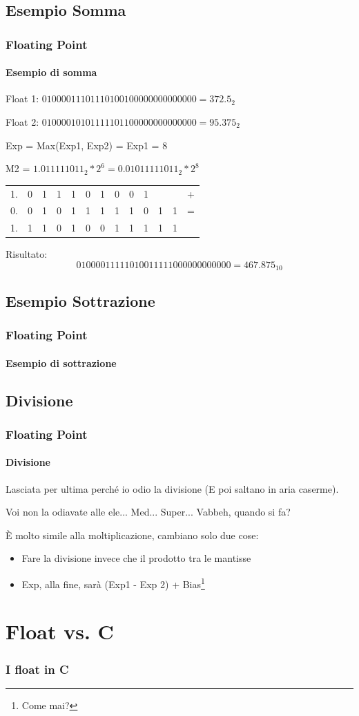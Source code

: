 \documentclass{beamer}
\begin{document}
	\subsection{Esempio Somma}
  \begin{frame}
    \frametitle{Floating Point}
    \framesubtitle{Esempio di somma}
    Float 1: $01000011101110100100000000000000 = 372.5_{2}$
    
    Float 2: $01000010101111101100000000000000 = 95.375_{2}$
    
    \pause
    \vspace{2em}
    
    Exp = Max(Exp1, Exp2) = Exp1 = 8
    
    M2 = $1.011111011_{2} * 2^{6} = 0.01011111011_{2} * 2^{8}$
    \vspace{1em}
    
    \setlength{\tabcolsep}{2pt}
    \begin{center}
    		\begin{tabular}{cccccccccccc|c}
    		1. & 0 & 1 & 1 & 1 & 0 & 1 & 0 & 0 & 1 &   &   & + \\ 
    		0. & 0 & 1 & 0 & 1 & 1 & 1 & 1 & 1 & 0 & 1 & 1 & = \\ 
    		\hline 
    		1. & 1 & 1 & 0 & 1 & 0 & 0 & 1 & 1 & 1 & 1 & 1 &   \\ 
    		\end{tabular} 
    \end{center}
    
    \pause 
    \vspace{1em}
    Risultato:
    $$01000011111010011111000000000000 = 467.875_{10}$$
  \end{frame}
  \subsection{Esempio Sottrazione}
  \begin{frame}
  		\frametitle{Floating Point}
  		\framesubtitle{Esempio di sottrazione}
  \end{frame}
  \subsection{Divisione}
  \begin{frame}
  		\frametitle{Floating Point}
  		\framesubtitle{Divisione}
  		Lasciata per ultima perché io odio la divisione (E poi saltano in aria caserme).
  		
  		\vspace{2em}
  		\pause
  		
  		Voi non la odiavate alle ele... Med... Super... Vabbeh, quando si fa?
  		
  		\vspace{2em}
  		\pause
  		
  		È molto simile alla moltiplicazione, cambiano solo due cose:
  		\begin{itemize}
  			\item Fare la divisione invece che il prodotto tra le mantisse
  			\item Exp, alla fine, sarà (Exp1 - Exp 2) + Bias\footnote{Come mai?}
  		\end{itemize}
  \end{frame}
  \section{Float vs. C}
  \begin{frame}
  		\frametitle{I float in C}
  \end{frame}
\end{document}
